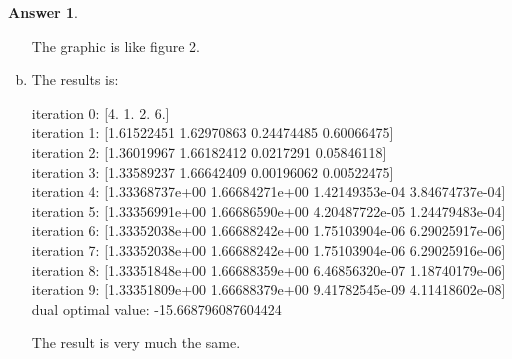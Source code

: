 \documentclass{article}
\theoremstyle{definition}
\newtheorem{ans}{Answer}
\begin{document}
\begin{ans}
\begin{enumerate}[(a)]
		The graphic is like figure 2.
		
		\item The results is:
		
		iteration 0: [4. 1. 2. 6.]\\
		iteration 1: [1.61522451 1.62970863 0.24474485 0.60066475]\\
		iteration 2: [1.36019967 1.66182412 0.0217291  0.05846118]\\
		iteration 3: [1.33589237 1.66642409 0.00196062 0.00522475]\\
		iteration 4: [1.33368737e+00 1.66684271e+00 1.42149353e-04 3.84674737e-04]\\
		iteration 5: [1.33356991e+00 1.66686590e+00 4.20487722e-05 1.24479483e-04]\\
		iteration 6: [1.33352038e+00 1.66688242e+00 1.75103904e-06 6.29025917e-06]\\
		iteration 7: [1.33352038e+00 1.66688242e+00 1.75103904e-06 6.29025916e-06]\\
		iteration 8: [1.33351848e+00 1.66688359e+00 6.46856320e-07 1.18740179e-06]\\
		iteration 9: [1.33351809e+00 1.66688379e+00 9.41782545e-09 4.11418602e-08]
		dual optimal value: -15.668796087604424
		
		The result is very much the same. 
	 \end{enumerate}
	\end{ans}
\end{document}
